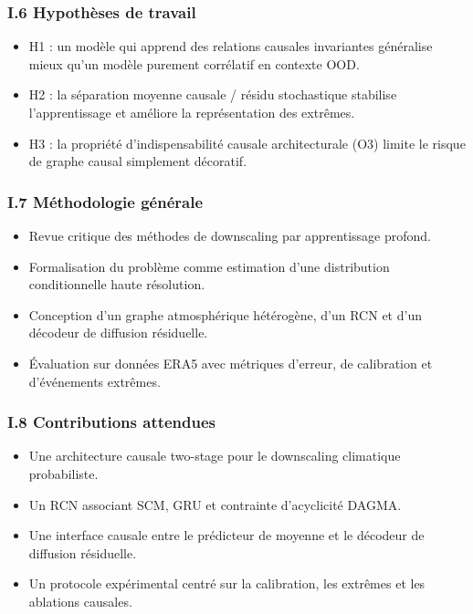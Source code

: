 \documentclass[12pt,a4paper]{article}
\begin{document}
\subsubsection*{I.6 Hypoth\`eses de travail}
\begin{itemize}
    \item H1 : un mod\`ele qui apprend des relations causales invariantes g\'en\'eralise mieux qu'un mod\`ele purement corr\'elatif en contexte OOD.
    \item H2 : la s\'eparation moyenne causale / r\'esidu stochastique stabilise l'apprentissage et am\'eliore la repr\'esentation des extr\^emes.
    \item H3 : la propri\'et\'e d'indispensabilit\'e causale architecturale (O3) limite le risque de graphe causal simplement d\'ecoratif.
\end{itemize}

\subsubsection*{I.7 M\'ethodologie g\'en\'erale}
\begin{itemize}
    \item Revue critique des m\'ethodes de downscaling par apprentissage profond.
    \item Formalisation du probl\`eme comme estimation d'une distribution conditionnelle haute r\'esolution.
    \item Conception d'un graphe atmosph\'erique h\'et\'erog\`ene, d'un RCN et d'un d\'ecodeur de diffusion r\'esiduelle.
    \item \'Evaluation sur donn\'ees ERA5 avec m\'etriques d'erreur, de calibration et d'\'ev\'enements extr\^emes.
\end{itemize}

\subsubsection*{I.8 Contributions attendues}
\begin{itemize}
    \item Une architecture causale two-stage pour le downscaling climatique probabiliste.
    \item Un RCN associant SCM, GRU et contrainte d'acyclicit\'e DAGMA.
    \item Une interface causale entre le pr\'edicteur de moyenne et le d\'ecodeur de diffusion r\'esiduelle.
    \item Un protocole exp\'erimental centr\'e sur la calibration, les extr\^emes et les ablations causales.
\end{itemize}
\end{document}

